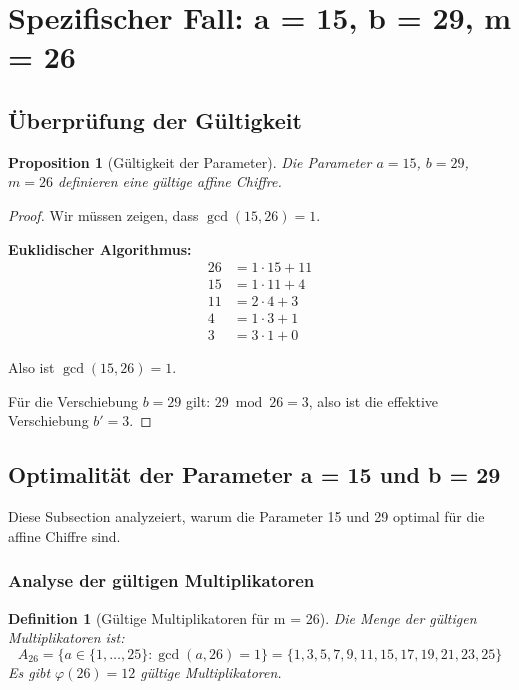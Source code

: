 ﻿\documentclass[12pt,a4paper]{article}
\newtheorem{definition}{Definition}
\newtheorem{proposition}[theorem]{Proposition}
\begin{document}
	\section{Spezifischer Fall: a = 15, b = 29, m = 26}
	
	\subsection{Überprüfung der Gültigkeit}
	
	\begin{proposition}[Gültigkeit der Parameter]
		Die Parameter $a = 15$, $b = 29$, $m = 26$ definieren eine gültige affine Chiffre.
	\end{proposition}
	
	\begin{proof}
		Wir müssen zeigen, dass $\gcd(15, 26) = 1$.
		
		\textbf{Euklidischer Algorithmus:}
		\begin{align}
			26 &= 1 \cdot 15 + 11 \\
			15 &= 1 \cdot 11 + 4 \\
			11 &= 2 \cdot 4 + 3 \\
			4 &= 1 \cdot 3 + 1 \\
			3 &= 3 \cdot 1 + 0
		\end{align}
		
		Also ist $\gcd(15, 26) = 1$. \checkmark
		
		Für die Verschiebung $b = 29$ gilt: $29 \bmod 26 = 3$, also ist die effektive Verschiebung $b' = 3$.
	\end{proof}
	
	\subsection{Optimalität der Parameter a = 15 und b = 29}
	
	Diese Subsection analyzeiert, warum die Parameter 15 und 29 optimal für die affine Chiffre sind.
	
	\subsubsection{Analyse der gültigen Multiplikatoren}
	
	\begin{definition}[Gültige Multiplikatoren für m = 26]
		Die Menge der gültigen Multiplikatoren ist:
		\begin{equation}
			A_{26} = \{a \in \{1,\ldots,25\} : \gcd(a, 26) = 1\} = \{1, 3, 5, 7, 9, 11, 15, 17, 19, 21, 23, 25\}
		\end{equation}
		Es gibt $\varphi(26) = 12$ gültige Multiplikatoren.
	\end{definition}
	
\end{document}
